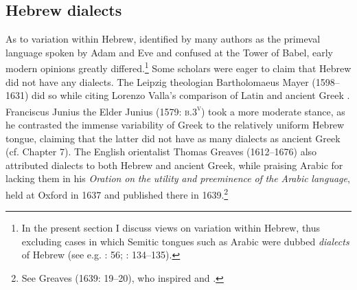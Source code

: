\subsection{Hebrew dialects}

As to variation within Hebrew, identified by many authors as the primeval language spoken by Adam and Eve and confused at the Tower of Babel, early modern opinions greatly differed.\footnote{In the present section I discuss views on variation within Hebrew, thus excluding cases in which Semitic tongues such as Arabic were dubbed \textit{dialects} of Hebrew (see e.g. \citealt{Bochart1646}: 56; \citealt{Martin1737}: 134–135).} Some scholars were eager to claim that Hebrew did not have any dialects. The Leipzig theologian Bartholomaeus Mayer (1598–1631) did so while citing Lorenzo Valla’s comparison of Latin and ancient Greek \citep[10]{Mayer1629}. Franciscus Junius the Elder Junius (1579: \textsc{b.3}\textsc{\textsuperscript{v}}) took a more moderate stance, as he contrasted the immense variability of Greek to the relatively uniform Hebrew tongue, claiming that the latter did not have as many dialects as ancient Greek (cf. Chapter 7). The English orientalist Thomas Greaves (1612–1676) also attributed dialects to both Hebrew and ancient Greek, while praising Arabic for lacking them in his \textit{Oration} \textit{on} \textit{the} \textit{utility} \textit{and} \textit{preeminence} \textit{of} \textit{the} \textit{Arabic} \textit{language}, held at Oxford in 1637 and published there in 1639.\footnote{See Greaves (1639: 19–20), who inspired \citet[60]{Leigh1656} and \citet[73]{Blount1680}.}

